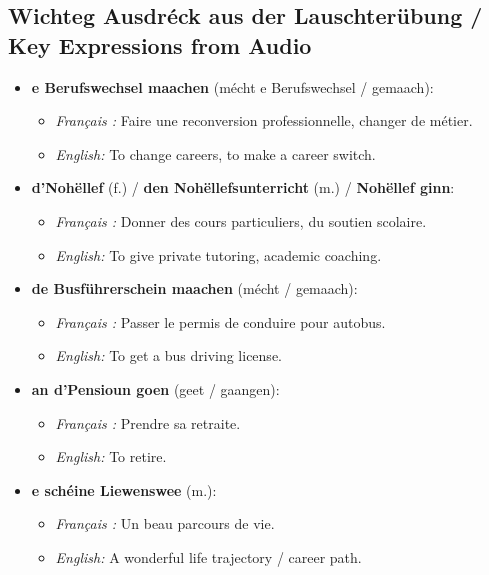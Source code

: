 \subsection*{Wichteg Ausdréck aus der Lauschterübung / Key Expressions from Audio}
\begin{itemize}
    \item \textbf{e Berufswechsel maachen} (mécht e Berufswechsel / gemaach):
    \begin{itemize}
        \item \textit{Français :} Faire une reconversion professionnelle, changer de métier.
        \item \textit{English:} To change careers, to make a career switch.
    \end{itemize}

    \item \textbf{d'Nohëllef} (f.) / \textbf{den Nohëllefsunterricht} (m.) / \textbf{Nohëllef ginn}:
    \begin{itemize}
        \item \textit{Français :} Donner des cours particuliers, du soutien scolaire.
        \item \textit{English:} To give private tutoring, academic coaching.
    \end{itemize}

    \item \textbf{de Busführerschein maachen} (mécht / gemaach):
    \begin{itemize}
        \item \textit{Français :} Passer le permis de conduire pour autobus.
        \item \textit{English:} To get a bus driving license.
    \end{itemize}

    \item \textbf{an d'Pensioun goen} (geet / gaangen):
    \begin{itemize}
        \item \textit{Français :} Prendre sa retraite.
        \item \textit{English:} To retire.
    \end{itemize}

    \item \textbf{e schéine Liewenswee} (m.):
    \begin{itemize}
        \item \textit{Français :} Un beau parcours de vie.
        \item \textit{English:} A wonderful life trajectory / career path.
    \end{itemize}
\end{itemize}

